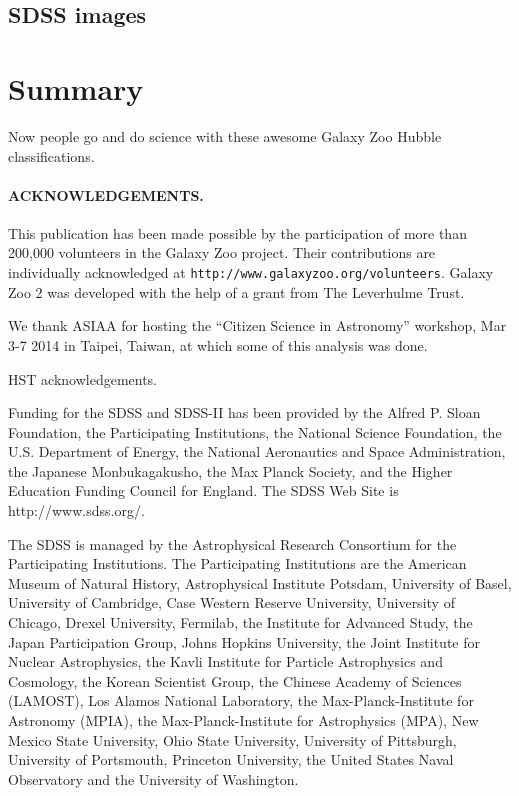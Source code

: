 \documentclass[usenatbib]{mn2e}
\begin{document}
\subsection{SDSS images}

\section{Summary}

Now people go and do science with these awesome Galaxy Zoo Hubble classifications.  
 
 
\paragraph*{ACKNOWLEDGEMENTS.} 

This publication has been made possible by the participation of more than 200,000 volunteers in the Galaxy Zoo project. Their contributions are individually acknowledged at \texttt{http://www.galaxyzoo.org/volunteers}. Galaxy Zoo 2 was developed with the help of a grant from The Leverhulme Trust. 

We thank ASIAA for hosting the ``Citizen Science in Astronomy'' workshop, Mar 3-7 2014 in Taipei, Taiwan, at which some of this analysis was done. 

HST acknowledgements.

Funding for the SDSS and SDSS-II has been provided by the Alfred P. Sloan Foundation, the Participating Institutions, the National Science Foundation, the U.S. Department of Energy, the National Aeronautics and Space Administration, the Japanese Monbukagakusho, the Max Planck Society, and the Higher Education Funding Council for England. The SDSS Web Site is http://www.sdss.org/. 

The SDSS is managed by the Astrophysical Research Consortium for the Participating Institutions. The Participating Institutions are the American Museum of Natural History, Astrophysical  Institute Potsdam, University of Basel, University of Cambridge, Case Western Reserve University, University of Chicago, Drexel University, Fermilab, the Institute for Advanced Study, the Japan Participation Group, Johns Hopkins University, the Joint Institute for Nuclear Astrophysics, the Kavli Institute for Particle Astrophysics and Cosmology, the Korean Scientist Group, the Chinese Academy of Sciences (LAMOST), Los Alamos National Laboratory, the Max-Planck-Institute for Astronomy (MPIA), the Max-Planck-Institute for Astrophysics (MPA), New Mexico State University, Ohio State University, University of Pittsburgh, University of Portsmouth, Princeton University, the United States Naval Observatory and the University of Washington. 


\end{document}
